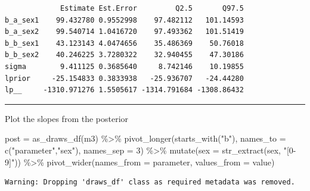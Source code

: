 \documentclass[
  letterpaper,
  DIV=11,
  numbers=noendperiod]{scrartcl}
\newenvironment{Shaded}{\begin{snugshade}}{\end{snugshade}}
\newcommand{\AttributeTok}[1]{\textcolor[rgb]{0.40,0.45,0.13}{#1}}
\newcommand{\DecValTok}[1]{\textcolor[rgb]{0.68,0.00,0.00}{#1}}
\newcommand{\FunctionTok}[1]{\textcolor[rgb]{0.28,0.35,0.67}{#1}}
\newcommand{\NormalTok}[1]{\textcolor[rgb]{0.00,0.23,0.31}{#1}}
\newcommand{\OtherTok}[1]{\textcolor[rgb]{0.00,0.23,0.31}{#1}}
\newcommand{\SpecialCharTok}[1]{\textcolor[rgb]{0.37,0.37,0.37}{#1}}
\newcommand{\StringTok}[1]{\textcolor[rgb]{0.13,0.47,0.30}{#1}}
\begin{document}
\begin{verbatim}
             Estimate Est.Error         Q2.5       Q97.5
b_a_sex1    99.432780 0.9552998    97.482112   101.14593
b_a_sex2    99.540714 1.0416720    97.493362   101.51419
b_b_sex1    43.123143 4.0474656    35.486369    50.76018
b_b_sex2    40.246225 3.7280322    32.940455    47.30186
sigma        9.411125 0.3685640     8.742146    10.19855
lprior     -25.154833 0.3833938   -25.936707   -24.44280
lp__     -1310.971276 1.5505617 -1314.791684 -1308.86432
\end{verbatim}

\begin{center}\rule{0.5\linewidth}{0.5pt}\end{center}

Plot the slopes from the posterior

\begin{Shaded}
\begin{Highlighting}[]
\NormalTok{post }\OtherTok{=} \FunctionTok{as\_draws\_df}\NormalTok{(m3) }\SpecialCharTok{\%\textgreater{}\%} 
  \FunctionTok{pivot\_longer}\NormalTok{(}\FunctionTok{starts\_with}\NormalTok{(}\StringTok{"b"}\NormalTok{),}
               \AttributeTok{names\_to =} \FunctionTok{c}\NormalTok{(}\StringTok{"parameter"}\NormalTok{,}\StringTok{"sex"}\NormalTok{),}
               \AttributeTok{names\_sep =} \DecValTok{3}\NormalTok{) }\SpecialCharTok{\%\textgreater{}\%} 
  \FunctionTok{mutate}\NormalTok{(}\AttributeTok{sex =} \FunctionTok{str\_extract}\NormalTok{(sex, }\StringTok{"[0{-}9]"}\NormalTok{)) }\SpecialCharTok{\%\textgreater{}\%} 
  \FunctionTok{pivot\_wider}\NormalTok{(}\AttributeTok{names\_from =}\NormalTok{ parameter, }\AttributeTok{values\_from =}\NormalTok{ value)}
\end{Highlighting}
\end{Shaded}

\begin{verbatim}
Warning: Dropping 'draws_df' class as required metadata was removed.
\end{verbatim}
\end{document}
